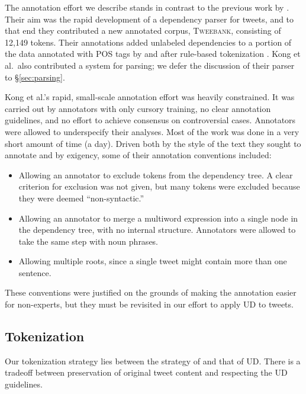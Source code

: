 \documentclass[11pt,a4paper]{article}
\begin{document}
The annotation effort we describe stands in contrast to the previous work
by .  Their aim was the rapid
development of a dependency parser for tweets, and to that end they
contributed a new annotated corpus, \textsc{Tweebank}, consisting of
12,149 tokens.  Their annotations added unlabeled dependencies to a portion of the data
annotated with POS tags by 
 and
 after rule-based tokenization \citep{ICWSM101540}.
Kong et al.~also contributed a system for parsing;
we defer the discussion of their parser to \S\ref{sec:parsing}.

Kong et al.'s rapid, small-scale annotation effort was heavily constrained.  It was
carried out by annotators with only cursory training, no clear
annotation guidelines, and no effort to achieve consensus on controversial
cases. Annotators were allowed to underspecify their analyses.
Most of the work was done in a very short amount of
time (a day).  Driven both by the style of the text they sought to annotate
and by exigency, some of their annotation conventions included:
\begin{itemize}
\item Allowing an annotator to exclude tokens from the dependency
  tree.  A clear criterion for exclusion was not given, but many
  tokens were excluded because they were deemed ``non-syntactic.''
\item Allowing an annotator to merge a multiword expression into a
  single node in the dependency tree, with no internal structure.
  Annotators were allowed to take the same step with noun phrases.
\item Allowing multiple roots, since a single tweet might contain more
  than one sentence.
\end{itemize}
These conventions were justified on the grounds of making the
annotation easier for non-experts, but they must be revisited in our
effort to apply UD to tweets.

\subsection{Tokenization}\label{sec:tok-anno}
Our tokenization strategy lies between the strategy of
\citet{ICWSM101540} and that of UD.
There is a tradeoff between preservation of original tweet content and respecting
the UD guidelines.
\end{document}
